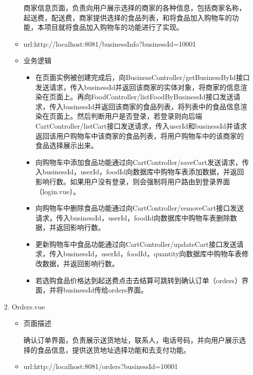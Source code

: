 \begin{enumerate}
\begin{itemize}
    商家信息页面，负责向用户展示选择的商家的各种信息，包括商家名称，起送费，配送费，商家提供选择的食品列表，和将食品加入购物车的功能，本项目就将食品加入购物车的功能进行了实现。

    \item url:http://localhost:8081/businessInfo?businessId=10001
    
    \item 业务逻辑
    \begin{itemize}
      \item 在页面实例被创建完成后，向BusinessController/getBusinessById接口发送请求，传入businessId并返回该商家的实体对象，将商家的信息渲染在页面上。再向FoodController/listFoodByBusinessId接口发送请求，传入businessId并返回该商家的食品列表，将列表中的食品信息渲染在页面上。然后判断用户是否登录，若登录则向后端CartController/listCart接口发送请求，传入userId和businessId并请求返回该用户购物车中该商家的食品列表，将用户购物车中的该商家的食品选择展示出来。
      \item 向购物车中添加食品功能通过向CartController/saveCart发送请求，传入businessId，userId，foodId向数据库中购物车表添加数据，并返回影响行数。如果用户没有登录，则会强制将用户路由到登录界面（login.vue）。
      \item 向购物车中删除食品功能通过向CartController/removeCart接口发送请求，传入businessId，userId，foodId向数据库中购物车表删除数据，并返回影响行数。
      \item 更新购物车中食品功能通过向CartController/updateCart接口发送请求，传入businessId，userId，foodId，quantity向数据库中购物车表修改数据，并返回影响行数。
      \item 若选购食品价格达到起送费点击去结算可跳转到确认订单（orders）界面，并将businessId传给orders界面。
    \end{itemize}

  \end{itemize}

  \item Orders.vue
  \begin{itemize}
    \item 页面描述
    
    确认订单界面，负责展示送货地址，联系人，电话号码，并向用户展示选择的食品信息，提供送货地址选择功能和去支付功能。

    \item url:http://localhost:8081/orders?businessId=10001
    

\end{itemize}
\end{enumerate}
